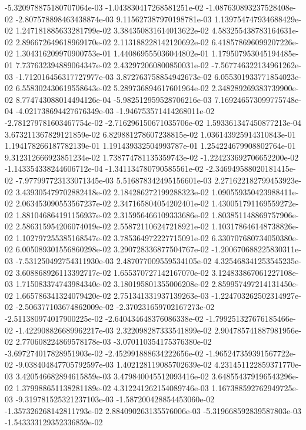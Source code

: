 -5.320978875180707064e-03	-1.043830417268581251e-02	-1.087630893237528408e-02	-2.807578898463438874e-03	9.115627387970198781e-03	1.139754747934688429e-02	1.247181885633281799e-02	3.384350831614013622e-02	4.583255438783164631e-02	2.896672649618969170e-02	2.113188228142120692e-02	6.418578696099207226e-02	1.304316209970900753e-01	1.440869555036044802e-01	1.179507953045194485e-01	7.737632394889064347e-02	2.432972060800850031e-02	-7.567746322134961262e-03	-1.712016456317727977e-03	3.872763758854942673e-02	6.055301933771854023e-02	6.558302430619558643e-02	5.289736894617601964e-02	2.348289269383739900e-02	8.774743088014494126e-04	-5.982512959528706216e-03	7.169246573099775748e-04	-4.021738694427676349e-03	-1.946753571414268011e-02	-2.781279781603467754e-02	-2.716296150671035706e-02	1.593361347450877213e-04	3.673211367829121859e-02	6.829881278607238815e-02	1.036143925914310843e-01	1.194178266187782139e-01	1.191439332504993787e-01	1.254224679908802764e-01	9.312312666923851234e-02	1.738774781135359743e-02	-1.224233692706652200e-02	-1.143354338244606712e-04	-1.341134780790585561e-02	-2.346949588020181415e-02	-7.977997723133071345e-03	5.516878342495156601e-03	2.271622182799453923e-02	3.439305479702882418e-02	2.184286272199288323e-02	1.090559350423988411e-02	2.063453090553567237e-02	2.347165804054202401e-02	1.430051791169559272e-02	1.881046864191156937e-02	2.315956466109333686e-02	1.803851148869757906e-02	2.586315954206074019e-02	2.558721106247218921e-02	1.103178646148738826e-02	1.102797255385168547e-02	3.785364972227715091e-02	6.330707680734050380e-02	6.005089301556860298e-02	3.290728336877504767e-02	-1.200670688225830311e-03	-7.531250492754311930e-03	2.487077009559534105e-02	4.325468341253545235e-02	3.608868926113392717e-02	1.655370727142167070e-02	3.124833867061227108e-03	1.715083374743984340e-02	3.180195801355006208e-02	2.859957497214131450e-02	1.665786341324079420e-02	2.751341331937139263e-03	-1.224703262502314927e-02	-2.506377103674862009e-02	-2.370231659702167273e-02	-2.511380974017900225e-02	-2.640434648376086338e-02	-1.799251327676185466e-02	-1.422908826689962217e-03	2.322098287333541899e-02	2.904785741887981956e-02	2.770608224869578178e-03	-3.070110354175376380e-02	-3.697274017828951903e-02	-2.452991888634222656e-02	-1.965247359391567722e-02	-9.038404847705792597e-03	1.402128119085702639e-02	4.231451122859371770e-03	3.420546682894615859e-03	3.479840045512093416e-02	3.648554379196543296e-02	1.379988651138281189e-02	4.312241262154089746e-03	1.167388592762949725e-03	-9.319781525321237103e-03	-1.587200428854453060e-02	-1.357326268142811793e-02	2.884090263135576006e-03	-5.319668592839587803e-03	-1.543333129352336859e-02
